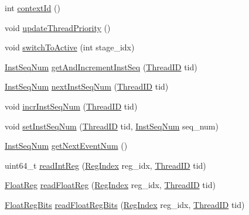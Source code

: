 \begin{DoxyCompactItemize}
\item 
int \hyperlink{classInOrderCPU_ac67c5e8e61fd7fe48edb5d70cb7aa490}{contextId} ()
\item 
void \hyperlink{classInOrderCPU_a00247488696e6ff608a2a44673578094}{updateThreadPriority} ()
\item 
void \hyperlink{classInOrderCPU_a20899487e4c954b6f0af2a5fc0a6cc6b}{switchToActive} (int stage\_\-idx)
\item 
\hyperlink{inst__seq_8hh_a258d93d98edaedee089435c19ea2ea2e}{InstSeqNum} \hyperlink{classInOrderCPU_a67230d0effe2bb65efc346f6bf296bdb}{getAndIncrementInstSeq} (\hyperlink{base_2types_8hh_ab39b1a4f9dad884694c7a74ed69e6a6b}{ThreadID} tid)
\item 
\hyperlink{inst__seq_8hh_a258d93d98edaedee089435c19ea2ea2e}{InstSeqNum} \hyperlink{classInOrderCPU_a5e508adfef98ea6ed53f25edcd5c9397}{nextInstSeqNum} (\hyperlink{base_2types_8hh_ab39b1a4f9dad884694c7a74ed69e6a6b}{ThreadID} tid)
\item 
void \hyperlink{classInOrderCPU_a411801cd4260db351142d4605f987203}{incrInstSeqNum} (\hyperlink{base_2types_8hh_ab39b1a4f9dad884694c7a74ed69e6a6b}{ThreadID} tid)
\item 
void \hyperlink{classInOrderCPU_a2d2e753e619aace6b421a932dd5f257f}{setInstSeqNum} (\hyperlink{base_2types_8hh_ab39b1a4f9dad884694c7a74ed69e6a6b}{ThreadID} tid, \hyperlink{inst__seq_8hh_a258d93d98edaedee089435c19ea2ea2e}{InstSeqNum} seq\_\-num)
\item 
\hyperlink{inst__seq_8hh_a258d93d98edaedee089435c19ea2ea2e}{InstSeqNum} \hyperlink{classInOrderCPU_ad382338533a75c038ece93a49091c9ca}{getNextEventNum} ()
\item 
uint64\_\-t \hyperlink{classInOrderCPU_a01d90b889dc598239bda63243ef365cf}{readIntReg} (\hyperlink{classInOrderCPU_a36d25e03e43fa3bb4c5482cbefe5e0fb}{RegIndex} reg\_\-idx, \hyperlink{base_2types_8hh_ab39b1a4f9dad884694c7a74ed69e6a6b}{ThreadID} tid)
\item 
\hyperlink{classInOrderCPU_a75484259f1855aabc8d74c6eb1cfe186}{FloatReg} \hyperlink{classInOrderCPU_aea9ee1636d5a4ee41fc873ab782096e5}{readFloatReg} (\hyperlink{classInOrderCPU_a36d25e03e43fa3bb4c5482cbefe5e0fb}{RegIndex} reg\_\-idx, \hyperlink{base_2types_8hh_ab39b1a4f9dad884694c7a74ed69e6a6b}{ThreadID} tid)
\item 
\hyperlink{classInOrderCPU_aab5eeae86499f9bfe15ef79360eccc64}{FloatRegBits} \hyperlink{classInOrderCPU_a29376f1c5a0787ea5f829651454f9205}{readFloatRegBits} (\hyperlink{classInOrderCPU_a36d25e03e43fa3bb4c5482cbefe5e0fb}{RegIndex} reg\_\-idx, \hyperlink{base_2types_8hh_ab39b1a4f9dad884694c7a74ed69e6a6b}{ThreadID} tid)

\end{DoxyCompactItemize}
